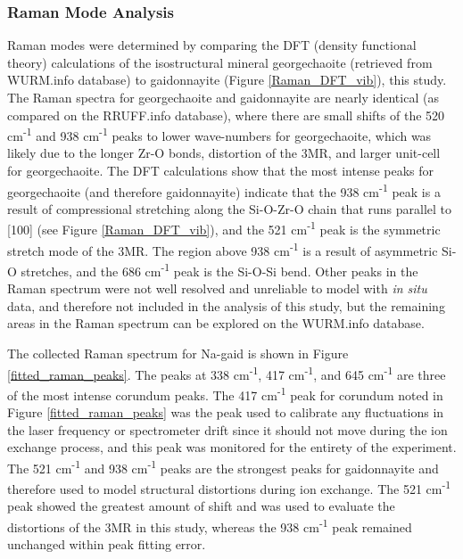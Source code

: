 \documentclass[journal=acsodf,manuscript=article]{achemso}
\begin{document}
\subsubsection{Raman Mode Analysis}

{\label{methods_raman_mode_analysis}}  %

Raman modes were determined by comparing the DFT (density functional
theory) calculations of the isostructural mineral georgechaoite 
(retrieved from WURM.info database) to gaidonnayite
(Figure {\ref{Raman_DFT_vib}}), this study.  The Raman spectra
for georgechaoite and gaidonnayite are nearly identical (as compared on
the RRUFF.info database), where there are small shifts of the 520
cm\textsuperscript{-1} and 938 cm\textsuperscript{-1} peaks to lower
wave-numbers for georgechaoite, which was likely due to the longer Zr-O
bonds, distortion of the 3MR, and larger unit-cell for georgechaoite. 
The DFT calculations show that the most intense peaks for georgechaoite
(and therefore gaidonnayite) indicate that the 938
cm\textsuperscript{-1} peak is a result of compressional stretching
along the Si-O-Zr-O chain that runs parallel to {[}100{]} (see
Figure {\ref{Raman_DFT_vib}}), and the 521
cm\textsuperscript{-1} peak is the symmetric stretch mode of the 3MR. 
The region above 938 cm\textsuperscript{-1} is a result of asymmetric
Si-O stretches, and the 686 cm\textsuperscript{-1} peak is the Si-O-Si
bend.  Other peaks in the Raman spectrum were not well resolved and
unreliable to model with \emph{in situ} data, and therefore not included
in the analysis of this study, but the remaining areas in the Raman
spectrum can be explored on the WURM.info database.



The collected Raman spectrum for Na-gaid is shown in
Figure {\ref{fitted_raman_peaks}}. The peaks at 338
cm\textsuperscript{-1}, 417 cm\textsuperscript{-1}, and  645
cm\textsuperscript{-1} are three of the most intense corundum peaks. The
417 cm\textsuperscript{-1} peak for corundum noted in
Figure {\ref{fitted_raman_peaks}} was the peak used to calibrate
any fluctuations in the laser frequency or spectrometer drift since it
should not move during the ion exchange process, and this peak was
monitored for the entirety of the experiment. The 521
cm\textsuperscript{-1} and 938 cm\textsuperscript{-1} peaks are the
strongest peaks for gaidonnayite and therefore used to model structural
distortions during ion exchange.  The 521 cm\textsuperscript{-1} peak
showed the greatest amount of shift and was used to evaluate the distortions of
the 3MR in this study, whereas the 938 cm\textsuperscript{-1} peak
remained unchanged within peak fitting error. 
\end{document}

